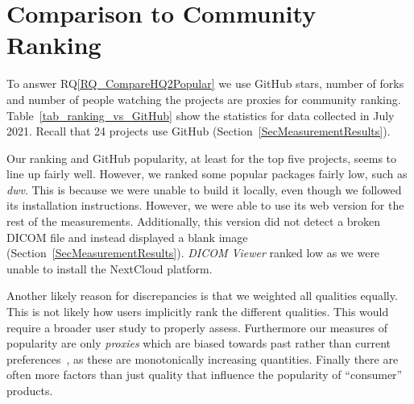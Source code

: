 \documentclass[final, 12pt, 3p, times]{elsarticle}
\newcommand{\rqref}[1]{RQ\ref{#1}}
\begin{document}
\section{Comparison to Community Ranking} \label{Sec_VsCommunityRanking}

To answer \rqref{RQ_CompareHQ2Popular} we use GitHub stars, number of forks and
number of people watching the projects are proxies for community ranking.
Table~\ref{tab_ranking_vs_GitHub} show the statistics for data collected in July
2021.  Recall that 24 projects use GitHub (Section~\ref{SecMeasurementResults}).

Our ranking and GitHub popularity, at least for the top five projects, seems to
line up fairly well. However, we ranked some popular packages fairly low, such
as \textit{dwv}. This is because we were unable to build it locally, even though
we followed its installation instructions. However, we were able to use its web
version for the rest of the measurements. Additionally, this version did not
detect a broken DICOM file and instead displayed a blank image
(Section~\ref{SecMeasurementResults}).  \textit{DICOM Viewer} ranked low as we
were unable to install the NextCloud platform.

Another likely reason for discrepancies is that we weighted all qualities
equally. This is not likely how users implicitly rank the different qualities.
This would require a broader user study to properly assess. Furthermore our
measures of popularity are only \emph{proxies} which are biased towards
past rather than current preferences~\cite{Szulik2017}, as these are
monotonically increasing quantities. Finally there are often more factors than
just quality that influence the popularity of ``consumer'' products.
\end{document}
